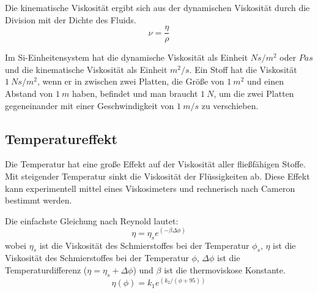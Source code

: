 Die kinematische Viskosität ergibt sich aus der dynamischen Viskosität durch die Division mit der Dichte des Fluids.
\begin{equation}
    \nu = \frac{\eta}{\rho}
    \label{eq:kinematische_viskotitaet}
\end{equation}

Im Si-Einheitensystem hat die dynamische Viskosität als Einheit $N  s/m^2$ oder $Pa  s$ und die kinematische Viskosität als Einheit $m^2/s$.
Ein Stoff hat die Viskosität $1~N  s/m^2$, wenn er in zwischen zwei Platten, die Größe von $1~m^2$ und einen Abstand von $1~m$ haben, befindet und man braucht $1~N$, um die zwei Platten gegeneinander mit einer Geschwindigkeit von $1~m/s$ zu verschieben.

\subsection*{Temperatureffekt}
\label{sub:temperatureffekt}
Die Temperatur hat eine große Effekt auf der Viskosität aller fließfähigen Stoffe.
Mit steigender Temperatur sinkt die Viskosität der Flüssigkeiten ab.
Diese Effekt kann experimentell mittel eines Viskosimeters und rechnerisch nach Cameron bestimmt werden.

Die einfachste Gleichung nach Reynold lautet:
\begin{equation}
    \eta = \eta_{s}  e^{\left( -\beta  \Delta\phi \right)}
    \label{eq:dynamische_viskositaet_reynold}
\end{equation}
%
wobei $\eta_{s}$ ist die Viskosität des Schmierstoffes bei der Temperatur $\phi_{s}$, $\eta$ ist die Viskosität des Schmierstoffes bei der Temperatur $\phi$, $\Delta{\phi}$ ist die Temperaturdifferenz ($\eta = \eta_{s} + \Delta{\phi}$) und $\beta$ ist die thermoviskose Konstante.
\begin{equation}
    \eta(\phi) = k_1  e^{ \left( k_2 / (\phi + 95) \right)}
    \label{eq:dynamische_viskositaet_cameron}
\end{equation}

